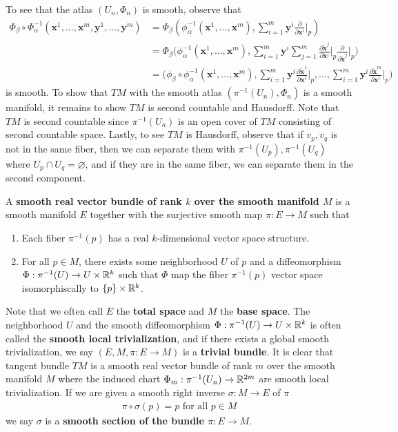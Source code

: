 \documentclass{report}
\begin{document}
\begin{mdframed}
To see that the atlas $(U_n,\Phi_n)$ is smooth, observe that 
\begin{align*}
\Phi_\beta \circ \Phi^{-1}_\alpha (\textbf{x}^1,\dots ,\textbf{x}^m ,\textbf{y}^1,\dots ,\textbf{y}^m)&= \Phi_\beta (\phi_\alpha ^{-1}(\textbf{x}^1,\dots ,\textbf{x}^m),\sum_{i=1}^m \textbf{y}^i \frac{\partial }{\partial \textbf{x}^i}\Big|_p)\\
&=\Phi_\beta \Big(\phi_\alpha ^{-1}(\textbf{x}^1,\dots ,\textbf{x}^m),\sum_{i=1}^m \textbf{y}^i \sum_{j=1}^m \frac{\partial \tilde{\textbf{x}}^j}{\partial  \textbf{x}^i}\Big|_p \frac{\partial }{\partial \tilde{\textbf{x}}^j}\Big|_p\Big)\\
&=\Big(\phi_\beta  \circ \phi^{-1}_\alpha (\textbf{x}^1,\dots ,\textbf{x}^m),\sum_{i=1}^m \textbf{y}^i \frac{\partial \tilde{\textbf{x}} ^1 }{\partial \textbf{x}^i}\Big|_p, \dots , \sum_{i=1}^m \textbf{y}^i \frac{\partial \tilde{\textbf{x}}^m }{\partial \textbf{x}^i}\Big|_p  \Big)
\end{align*}
is smooth. To show that $TM$ with the smooth atlas  $(\pi^{-1}(U_n),\Phi_n)$ is a smooth manifold, it remains to show $TM$ is second countable and Hausdorff. Note that $TM$ is second countable since  $\pi^{-1}(U_n)$ is an open cover of $TM$ consisting of second countable space. Lastly, to see $TM$ is Hausdorff, observe that if $v_p,v_q$ is not in the same fiber, then we can separate them with $\pi^{-1}(U_p),\pi^{-1}(U_q)$ where $U_p\cap U_q=\varnothing$, and if they are in the same fiber, we can separate them in the second component.  
\end{mdframed}
\begin{mdframed}
A \textbf{smooth real vector bundle of rank $k$ over the smooth manifold $M$} is a smooth manifold $E$ together with the surjective smooth map  $\pi : E\rightarrow M$ such that 
\begin{enumerate}[label=(\alph*)]
  \item Each fiber $\pi^{-1}(p)$ has a real $k$-dimensional vector space structure. 
  \item For all $p \in M$, there exists some neighborhood $U$ of  $p$ and a diffeomorphism  $\Phi:\pi^{-1}(U)\rightarrow U\times \mathbb{R}^k$ such that $\Phi$ map the fiber $\pi^{-1}(p)$ vector space isomorphiscally to $\{ p \}\times \mathbb{R}^k$. 
\end{enumerate}
Note that we often call $E$ the  \textbf{total space} and $M$ the  \textbf{base space}. The neighborhood $U$ and the smooth diffeomorphism $\Phi:\pi^{-1}(U)\rightarrow U\times \mathbb{R}^k$ is often called the \textbf{smooth local trivialization}, and if there exists a global smooth trivialization, we say $(E,M,\pi:E\rightarrow M)$ is a \textbf{trivial bundle}. It is clear that tangent bundle $TM$ is a smooth real vector bundle of rank  $m$ over the smooth manifold  $M$ where the induced chart  $\Phi_m :\pi^{-1}(U_n)\rightarrow \mathbb{R}^{2m}$ are smooth local trivialization. If we are given a smooth right inverse  $\sigma:M\rightarrow E$ of $\pi$
\begin{align*}
\pi \circ \sigma (p)=p\text{ for all }p \in M
\end{align*}
we say $\sigma$ is a \textbf{smooth section of the bundle $\pi:E\rightarrow M$}. 
\end{mdframed}
\end{document}
